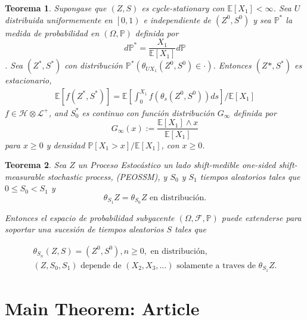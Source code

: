 \documentclass{article}
\newtheorem{Teo}{Teorema}
\newcommand{\esp}{\mathbb{E}}
\newcommand{\prob}{\mathbb{P}}
\begin{document}
\begin{Teo}
Supongase que $\left(Z,S\right)$ es cycle-stationary con $\esp\left[X_{1}\right]<\infty$. Sea $U$ distribuida uniformemente en $\left[0,1\right)$ e independiente de $\left(Z^{0},S^{0}\right)$ y sea $\prob^{*}$ la medida de probabilidad en $\left(\Omega,\prob\right)$ definida por $$d\prob^{*}=\frac{X_{1}}{\esp\left[X_{1}\right]}d\prob$$. Sea $\left(Z^{*},S^{*}\right)$ con distribuci\'on $\prob^{*}\left(\theta_{UX_{1}}\left(Z^{0},S^{0}\right)\in\cdot\right)$. Entonces $\left(Z^{}*,S^{*}\right)$ es estacionario,
\begin{eqnarray*}
\esp\left[f\left(Z^{*},S^{*}\right)\right]=\esp\left[\int_{0}^{X_{1}}f\left(\theta_{s}\left(Z^{0},S^{0}\right)\right)ds\right]/\esp\left[X_{1}\right]
\end{eqnarray*}
$f\in\mathcal{H}\otimes\mathcal{L}^{+}$, and $S_{0}^{*}$ es continuo con funci\'on distribuci\'on $G_{\infty}$ definida por $$G_{\infty}\left(x\right):=\frac{\esp\left[X_{1}\right]\wedge x}{\esp\left[X_{1}\right]}$$ para $x\geq0$ y densidad $\prob\left[X_{1}>x\right]/\esp\left[X_{1}\right]$, con $x\geq0$.

\end{Teo}


\begin{Teo}
Sea $Z$ un Proceso Estoc\'astico un lado shift-medible \textit{one-sided shift-measurable stochastic process}, (PEOSSM),
y $S_{0}$ y $S_{1}$ tiempos aleatorios tales que $0\leq S_{0}<S_{1}$ y
\begin{equation}
\theta_{S_{1}}Z=\theta_{S_{0}}Z\textrm{ en distribuci\'on}.
\end{equation}

Entonces el espacio de probabilidad subyacente $\left(\Omega,\mathcal{F},\prob\right)$ puede extenderse para soportar una sucesi\'on de tiempos aleatorios $S$ tales que

\begin{eqnarray}
\theta_{S_{n}}\left(Z,S\right)=\left(Z^{0},S^{0}\right),n\geq0,\textrm{ en distribuci\'on},\\
\left(Z,S_{0},S_{1}\right)\textrm{ depende de }\left(X_{2},X_{3},\ldots\right)\textrm{ solamente a traves de }\theta_{S_{1}}Z.
\end{eqnarray}
\end{Teo}
\section{Main Theorem: Article}
\end{document}
